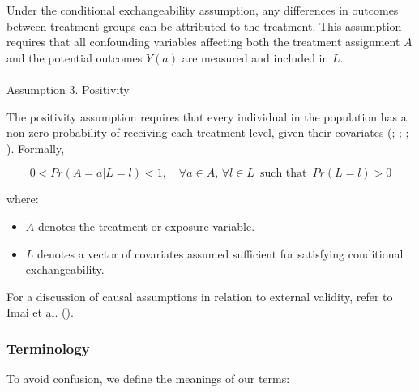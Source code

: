 \documentclass[
  single column]{article}
\makeatletter
\let\oldparagraph\paragraph
\renewcommand{\paragraph}{
    \@ifstar
      \xxxParagraphStar
      \xxxParagraphNoStar
  }
\newcommand{\xxxParagraphStar}[1]{\oldparagraph*{#1}\mbox{}}
\newcommand{\xxxParagraphNoStar}[1]{\oldparagraph{#1}\mbox{}}
\providecommand{\tightlist}{%
  \setlength{\itemsep}{0pt}\setlength{\parskip}{0pt}}\usepackage{longtable,booktabs,array}
\makeatother
\begin{document}
Under the conditional exchangeability assumption, any differences in
outcomes between treatment groups can be attributed to the treatment.
This assumption requires that all confounding variables affecting both
the treatment assignment \(A\) and the potential outcomes \(Y(a)\) are
measured and included in \(L\).

\paragraph{Assumption 3. Positivity}\label{assumption-3.-positivity}

The positivity assumption requires that every individual in the
population has a non-zero probability of receiving each treatment level,
given their covariates (; ;
;
). Formally,

\[
0 < Pr(A = a | L = l) < 1, \quad \forall a \in A, \, \forall l \in L \, \text{ such that } \, Pr(L = l) > 0
\]

where:

\begin{itemize}
\tightlist
\item
  \(A\) denotes the treatment or exposure variable.
\item
  \(L\) denotes a vector of covariates assumed sufficient for satisfying
  conditional exchangeability.
\end{itemize}

For a discussion of causal assumptions in relation to external validity,
refer to Imai et al. ().

\subsubsection{Terminology}\label{terminology}

To avoid confusion, we define the meanings of our terms:
\end{document}
